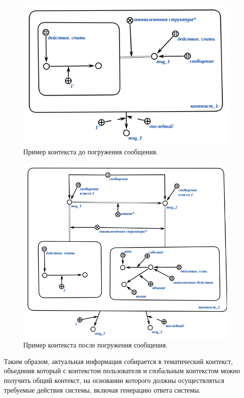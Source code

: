 \begin{figure}[h]
    \centering
    \includegraphics[scale=0.8]{images/part4/chapter_nl_interfaces/context_1}
    \caption{Пример контекста до погружения сообщения.}
    \label{fig:context_before_update}
\end{figure}

\begin{figure}[h]
    \centering
    \includegraphics[scale=0.8]{images/part4/chapter_nl_interfaces/context_2}
    \caption{Пример контекста после погружения сообщения.}
    \label{fig:updated_context}
\end{figure}

Таким образом, актуальная информация собирается в тематический контекст, объединив который с контекстом пользователя и глобальным контекстом можно получить общий контекст, на основании которого должны осуществляться требуемые действия системы, включая генерацию ответа системы.

